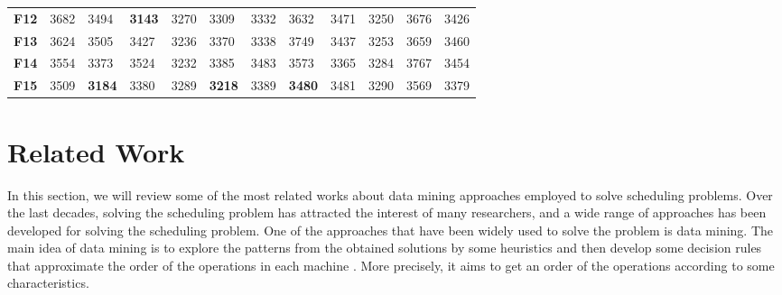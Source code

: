 \documentclass[runningheads]{llncs}
\begin{document}
\begin{table}
\begin{center}
\begin{tabular}{|l|l|l|l|l|l|l|l|l|l|l|l|}
      \textbf{F12}         & 3682                           & 3494                           & \textbf{3143} & 3270 & 3309                           & 3332                           & 3632                           & 3471 & 3250                           & 3676 & 3426 \\
      \textbf{F13}         & 3624                           & 3505                           & 3427                           & 3236 & 3370                           & 3338                           & 3749                           & 3437 & 3253                           & 3659 & 3460 \\
      \textbf{F14}         & 3554                           & 3373                           & 3524                           & 3232 & 3385                           & 3483                           & 3573                           & 3365 & 3284                           & 3767 & 3454 \\
      \textbf{F15}         & 3509                           & \textbf{3184} & 3380                           & 3289 & \textbf{3218} & 3389                           & \textbf{3480} & 3481 & 3290                           & 3569 & 3379 \\ \hline
      \end{tabular}
  \end{center}
\end{table}



\section{Related Work}
\label{sec:literature}
In this section, we will review some of the most related works about data mining approaches employed to solve scheduling problems. Over the last decades, solving the scheduling problem has attracted the interest of many researchers, and a wide range of approaches has been developed for solving the scheduling problem. One of the approaches that have been widely used to solve the problem is data mining. The main idea of data mining is to explore the patterns from the obtained solutions by some heuristics and then develop some decision rules that approximate the order of the operations in each machine \cite{ismail2012production}. More precisely, it aims to get an order of the operations according to some characteristics.\\
\end{document}
